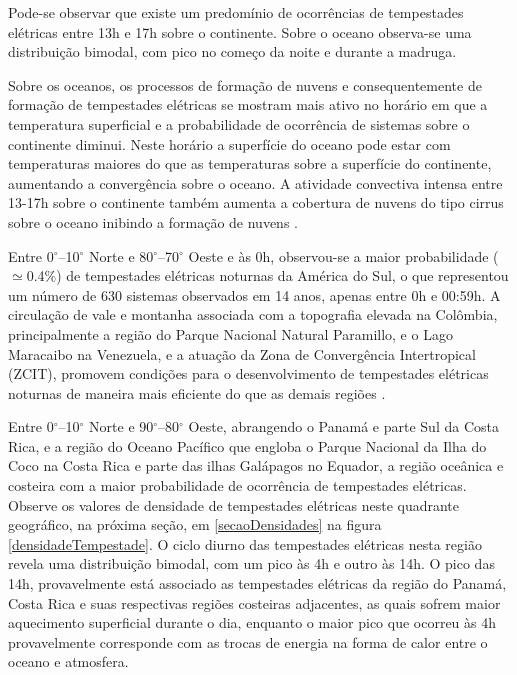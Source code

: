 Pode-se observar que existe um predomínio de ocorrências de tempestades elétricas entre 13h e 17h sobre o continente. Sobre o oceano observa-se  uma distribuição bimodal, com pico no começo da noite e durante a madruga.


Sobre os oceanos, os processos de formação de nuvens e consequentemente de formação de tempestades elétricas se mostram mais ativo no horário em que a temperatura superficial e a probabilidade de ocorrência de sistemas sobre o continente  diminui. Neste horário a superfície do oceano pode estar com temperaturas maiores do que as temperaturas sobre a superfície do continente, aumentando a convergência sobre o oceano. A atividade convectiva intensa entre 13-17h sobre o continente também aumenta a cobertura de nuvens do tipo cirrus sobre o oceano inibindo a formação de nuvens \cite{nesbitt2003diurnal}.



Entre 0$^{\circ}$--10$^{\circ}$ Norte e 80$^{\circ}$--70$^{\circ}$ Oeste e às 0h, observou-se a maior probabilidade ($\simeq$0.4\%) de tempestades elétricas noturnas da América do Sul, o que representou um número de 630 sistemas observados em 14 anos, apenas entre 0h e 00:59h. A circulação de vale e montanha associada com a topografia elevada na Colômbia, principalmente a região do Parque Nacional Natural Paramillo, e o Lago Maracaibo na Venezuela, e a atuação da Zona de Convergência Intertropical (ZCIT), promovem condições para o desenvolvimento de tempestades elétricas noturnas de maneira mais eficiente do que as demais regiões \cite{burgesser2012}.

Entre 0$^{\circ}$--10$^{\circ}$ Norte e 90$^{\circ}$--80$^{\circ}$ Oeste, abrangendo o Panamá e parte Sul da Costa Rica, e a região do Oceano Pacífico que engloba o Parque Nacional da Ilha do Coco na Costa Rica e parte das ilhas Galápagos no Equador,  a  região oceânica e costeira com a maior probabilidade de ocorrência de tempestades elétricas. Observe os valores de densidade de tempestades elétricas neste quadrante geográfico, na próxima seção, em \ref{secaoDensidades} na figura \ref{densidadeTempestade}. O ciclo diurno das tempestades elétricas nesta região revela uma distribuição bimodal, com um pico às 4h e outro às 14h. O pico das 14h, provavelmente está associado as tempestades elétricas da região do Panamá, Costa Rica e suas respectivas regiões costeiras adjacentes, as quais sofrem maior aquecimento superficial durante o dia, enquanto o maior pico que  ocorreu às 4h provavelmente corresponde com as trocas de energia na forma de calor entre o oceano e atmosfera.

